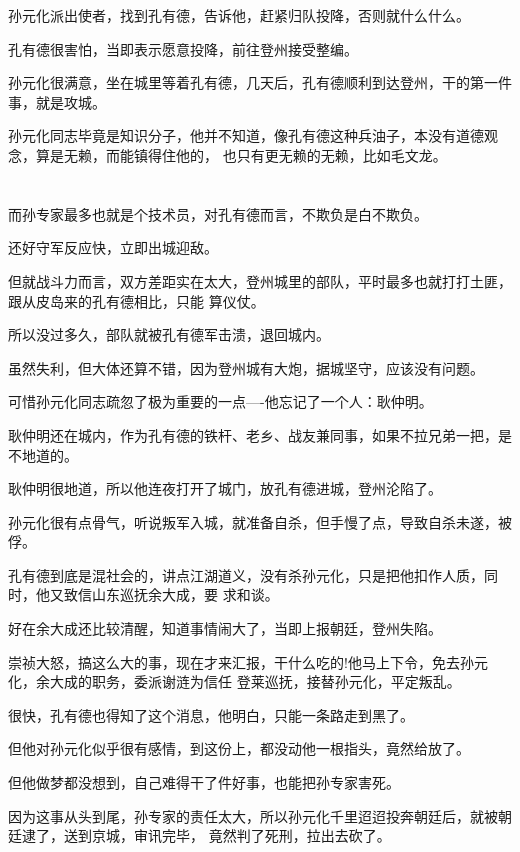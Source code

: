 \documentclass[11pt,a4paper,onecolumn]{article}
\begin{document}
孙元化派出使者，找到孔有德，告诉他，赶紧归队投降，否则就什么什么。

孔有德很害怕，当即表示愿意投降，前往登州接受整编。

孙元化很满意，坐在城里等着孔有德，几天后，孔有德顺利到达登州，干的第一件事，就是攻城。

孙元化同志毕竟是知识分子，他并不知道，像孔有德这种兵油子，本没有道德观念，算是无赖，而能镇得住他的，
也只有更无赖的无赖，比如毛文龙。

\section[\thesection]{}

而孙专家最多也就是个技术员，对孔有德而言，不欺负是白不欺负。

还好守军反应快，立即出城迎敌。

但就战斗力而言，双方差距实在太大，登州城里的部队，平时最多也就打打土匪，跟从皮岛来的孔有德相比，只能
算仪仗。

所以没过多久，部队就被孔有德军击溃，退回城内。

虽然失利，但大体还算不错，因为登州城有大炮，据城坚守，应该没有问题。

可惜孙元化同志疏忽了极为重要的一点----他忘记了一个人：耿仲明。

耿仲明还在城内，作为孔有德的铁杆、老乡、战友兼同事，如果不拉兄弟一把，是不地道的。

耿仲明很地道，所以他连夜打开了城门，放孔有德进城，登州沦陷了。

孙元化很有点骨气，听说叛军入城，就准备自杀，但手慢了点，导致自杀未遂，被俘。

孔有德到底是混社会的，讲点江湖道义，没有杀孙元化，只是把他扣作人质，同时，他又致信山东巡抚余大成，要
求和谈。

好在余大成还比较清醒，知道事情闹大了，当即上报朝廷，登州失陷。

崇祯大怒，搞这么大的事，现在才来汇报，干什么吃的!他马上下令，免去孙元化，余大成的职务，委派谢涟为信任
登莱巡抚，接替孙元化，平定叛乱。

很快，孔有德也得知了这个消息，他明白，只能一条路走到黑了。

但他对孙元化似乎很有感情，到这份上，都没动他一根指头，竟然给放了。

但他做梦都没想到，自己难得干了件好事，也能把孙专家害死。

因为这事从头到尾，孙专家的责任太大，所以孙元化千里迢迢投奔朝廷后，就被朝廷逮了，送到京城，审讯完毕，
竟然判了死刑，拉出去砍了。
\end{document}
